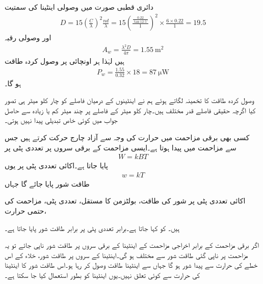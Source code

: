 دائری قطبی صورت میں وصولی اینٹینا کی سمتیت
\begin{align*}
D=15 \left(\frac{C}{\lambda}\right)^2\frac{n d}{\lambda}=15 \left(\frac{\frac{0.22}{\tan 12.5^{\circ}}}{1} \right)^2\times \frac{6 \times 0.22}{1}=19.5
\end{align*}
اور وصولی رقبہ
\begin{align*}
A_w=\frac{\lambda^2 D}{4\pi}=\SI{1.55}{\meter\squared}
\end{align*}
ہیں لہٰذا ہر اونچائی پر وصول کردہ طاقت
\begin{align*}
P_w=\frac{1.55}{0.32} \times 18=\SI{87}{\micro \watt}
\end{align*}
ہو گا۔

وصول کردہ طاقت کا تخمینہ لگاتے ہوئے ہم نے اینٹینوں کے درمیان فاصلے کو چار کلو میٹر ہی تصور کیا اگرچہ حقیقی فاصلے قدر مختلف ہیں۔چار کلو میٹر کے فاصلے پر چند میٹر کم یا زیادہ سے حاصل جواب میں کوئی خاص تبدیلی پیدا نہیں ہوتی۔

کسی بھی برقی مزاحمت  میں حرارت  کی وجہ سے آزاد چارج حرکت کرتے ہیں جس سے مزاحمت میں  پیدا ہوتا ہے۔ایسی مزاحمت کے برقی سروں پر  تعددی پٹی پر 
\begin{align}\label{مساوات_اینٹینا_طاقت_شور_الف}
W=k B T
\end{align}
 پایا جاتا ہے۔اکائی تعددی پٹی پر یوں
\begin{align}
w=kT
\end{align}
طاقت شور پایا جائے گا جہاں
\begin{description}
 اکائی تعددی پٹی پر شور کی طاقت،  
 بولٹزمن کا مستقل، 
 تعددی پٹی، 
 مزاحمت کی حتمی حرارت، 
\end{description}
ہیں۔  کو  کہا جاتا ہے۔برابر تعددی پٹی پر برابر طاقت شور پایا جاتا ہے۔

اگر برقی مزاحمت  کے برابر اخراجی مزاحمت  کے اینٹینا کے برقی سروں پر طاقت شور ناپی جائے تو یہ مزاحمت پر ناپی گئی طاقت شور سے مختلف ہو گی۔اینٹینا کے سروں پر طاقت شور، خلاء کے اس خطے کی حرارت  سے پیدا شور ہو گا جہاں سے اینٹینا طاقت وصول کر رہا ہو۔اس طاقت شور کا اینٹینا کی حرارت سے کوئی تعلق نہیں۔یوں اینٹینا کو بطور  استعمال کیا جا سکتا ہے۔

